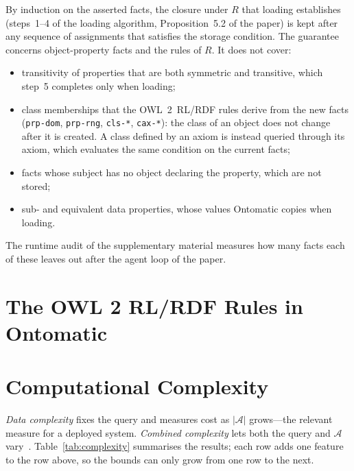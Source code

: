 \documentclass[11pt, a4paper]{article}
\theoremstyle{plain}
\theoremstyle{definition}
\theoremstyle{remark}
\begin{document}
By induction on the asserted facts, the closure under $R$ that loading establishes
(steps~1--4 of the loading algorithm, Proposition~5.2 of the paper) is kept after any sequence of
assignments that satisfies the storage condition. The guarantee concerns object-property facts
and the rules of $R$. It does not cover:
\begin{itemize}
  \item transitivity of properties that are both symmetric and transitive, which step~5
        completes only when loading;
  \item class memberships that the OWL~2~RL/RDF rules derive from the new facts
        (\texttt{prp-dom}, \texttt{prp-rng}, \texttt{cls-*}, \texttt{cax-*}): the class of
        an object does not change after it is created. A class defined by an axiom is instead
        queried through its axiom, which evaluates the same condition on the current facts;
  \item facts whose subject has no object declaring the property, which are not stored;
  \item sub- and equivalent data properties, whose values Ontomatic copies when loading.
\end{itemize}
The runtime audit of the supplementary material measures how many facts each of these leaves
out after the agent loop of the paper.

\section{The OWL 2 RL/RDF Rules in Ontomatic}
\label{sec:rl-rules}





\section{Computational Complexity}
\label{sec:eql:complexity}

\emph{Data complexity} fixes the query and measures cost as $|\mathcal{A}|$ grows---the
relevant measure for a deployed system.  \emph{Combined complexity} lets both the query and
$\mathcal{A}$ vary~\cite{vardi1982complexity}.  Table~\ref{tab:complexity} summarises the
results; each row adds one feature to the row above, so the bounds can only grow from one row
to the next.
\end{document}
